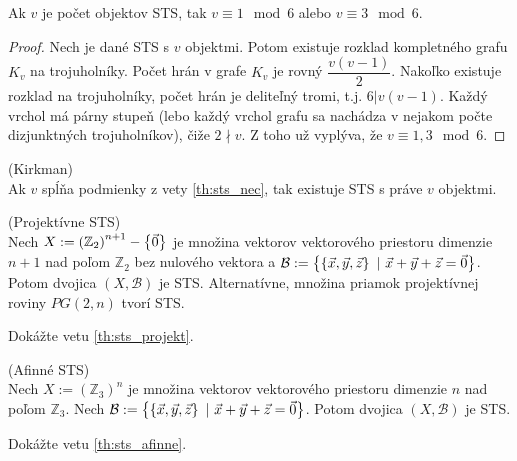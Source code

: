 \begin{theorem}
\label{th:sts_nec}
Ak $v$ je počet objektov STS, tak $v \equiv 1 \mod 6$ alebo $v \equiv 3 \mod 6$.
\end{theorem}
\begin{proof}
Nech je dané STS s $v$ objektmi. 
Potom existuje rozklad kompletného grafu $K_v$ na trojuholníky.
Počet hrán v grafe $K_v$ je rovný $\dfrac{v (v-1)}{2}$.
Nakoľko existuje rozklad na trojuholníky, počet hrán je deliteľný tromi, t.j. $6 | v (v-1)$.
Každý vrchol má párny stupeň (lebo každý vrchol grafu sa nachádza v nejakom počte dizjunktných trojuholníkov), čiže $2 \nmid v$. 
Z toho už vyplýva, že $v \equiv 1, 3 \mod 6$.
\end{proof}


\begin{theorem_hard}{(Kirkman)}\\
Ak $v$ spĺňa podmienky z vety \ref{th:sts_nec}, tak existuje STS s práve $v$ objektmi.
\end{theorem_hard}

\begin{theorem}{(Projektívne STS)}\\
\label{th:sts_projekt}
Nech $X := \left(\mathbb{Z}_2\right)^{n+1} - \left\{\vec{0}\right\}$ je množina vektorov vektorového priestoru dimenzie $n+1$ nad poľom $\mathbb{Z}_2$ bez nulového vektora a 
$\mathcal{B} := \left\{\left\{\vec{x}, \vec{y}, \vec{z}\right\} ~|~ \vec{x} + \vec{y} + \vec{z} = \vec{0}\right\}$.
Potom dvojica $(X, \mathcal{B})$ je STS. Alternatívne, množina priamok projektívnej roviny $PG(2, n)$ tvorí STS.
\end{theorem}
\begin{exercise}
Dokážte vetu \ref{th:sts_projekt}.
\end{exercise}

\begin{theorem}{(Afinné STS)}\\
\label{th:sts_afinne}
Nech $X := \left(\mathbb{Z}_3\right)^{n}$ je množina vektorov vektorového priestoru dimenzie $n$ nad poľom $\mathbb{Z}_3$. 
Nech $\mathcal{B} := \left\{\left\{\vec{x}, \vec{y}, \vec{z}\right\} ~|~ \vec{x} + \vec{y} + \vec{z} = \vec{0}\right\}$. Potom 
dvojica $(X, \mathcal{B})$ je STS.
\end{theorem}
\begin{exercise}
Dokážte vetu \ref{th:sts_afinne}.
\end{exercise}

